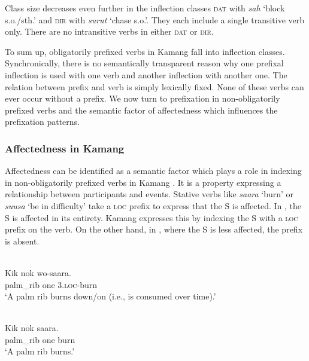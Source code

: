  

 



Class size decreases even further in the inflection classes  \textsc{dat} with \textit{sah} `block s.o./sth.' and \textsc{dir} with \textit{surut} `chase s.o.'. They each include a single transitive verb only. There are no intransitive verbs in either \textsc{dat} or \textsc{dir}.

  To sum up, obligatorily prefixed verbs in Kamang  fall into inflection classes. Synchronically, there is no semantically transparent reason why one prefixal inflection is used with one verb and another inflection with another one. The relation between prefix and verb is simply lexically fixed. None of these verbs can ever occur without a prefix. We now turn to prefixation in non-obligatorily prefixed verbs and the semantic factor of affectedness which influences the prefixation patterns. 

\subsubsection{Affectedness in Kamang}  
Affectedness can be identified as a semantic factor which plays a role in indexing in non-obligatorily prefixed verbs in Kamang . It is a property expressing a relationship between participants and events. Stative verbs like \textit{saara} `burn' or \textit{suusa} `be in difficulty' take a \textsc{loc} prefix to express that the S is affected. In , the S is affected in its entirety. Kamang  expresses this by indexing the S with a \textsc{loc} prefix on the verb. On the other hand, in , where the S is less affected, the prefix is absent.


\ea 
\label{ex:10:1239}
 \\ 
 \gll   Kik  nok  wo-saara.   \\
    palm\_rib  one  3\textsc{.loc-}burn   \\
 \glt  `A palm rib burns down/on (i.e., is consumed over time).'
\z



\ea 
\label{ex:10:1240}
 \\ 
 \gll   Kik  nok  saara.   \\
  palm\_rib  one  burn     \\
 \glt  `A palm rib burns.'
\z



